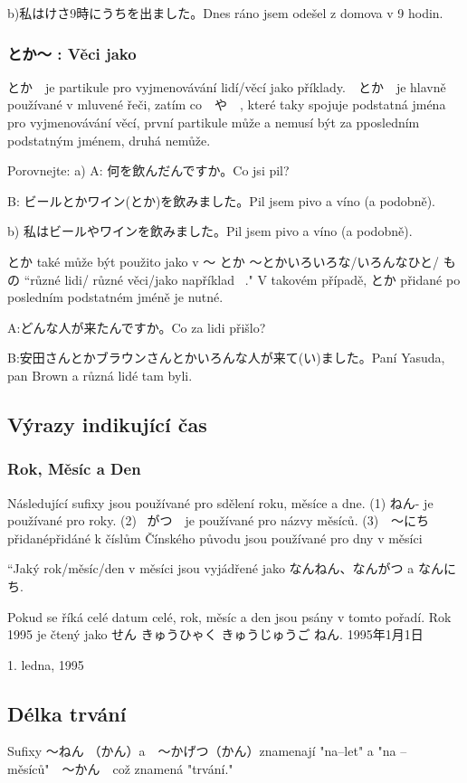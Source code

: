 b)私はけさ9時にうちを出ました。Dnes ráno jsem odešel z domova v 9 hodin.


\subsubsection{ とか〜 : Věci jako}
とか　je partikule pro vyjmenovávání lidí/věcí jako příklady.　とか　je hlavně používané v mluvené řeči, zatím co　や　, které taky spojuje podstatná jména pro vyjmenovávání věcí, první partikule může a nemusí být za pposledním podstatným jménem, druhá nemůže.

Porovnejte:
a)
 A: 何を飲んだんですか。Co jsi pil?
 
B: ビールとかワイン(とか)を飲みました。Pil jsem pivo a víno (a podobně).

b) 私はビールやワインを飲みました。Pil jsem pivo a víno (a podobně).


とか také může být použito jako v 〜 とか 〜とかいろいろな/いろんなひと/ もの “různé lidi/ různé věci/jako například ~." V takovém případě, とか přidané po posledním podstatném jméně je nutné.

A:どんな人が来たんですか。Co za lidi přišlo?

B:安田さんとかブラウンさんとかいろんな人が来て(い)ました。Paní Yasuda, pan Brown a různá lidé tam byli.

\subsection{Výrazy indikující čas}
\subsubsection{ Rok, Měsíc a Den}

Následující sufixy jsou používané pro sdělení roku, měsíce a dne.
(1) ねん- je používané pro roky.
(2) ~がつ　je používané pro názvy měsíců.
(3)　〜にち přidanépřidáné k číslům Čínského původu jsou používané pro dny v měsíci

“Jaký rok/měsíc/den v měsíci jsou vyjádřené jako  なんねん、なんがつ a なんにち. 

Pokud se říká celé datum celé, rok, měsíc a den jsou psány v tomto pořadí. Rok 1995 je čtený jako せん きゅうひゃく きゅうじゅうご ねん.
1995年1月1日

1. ledna, 1995

\subsection{Délka trvání}
Sufixy 〜ねん （かん）a　〜かげつ（かん）znamenají  "na--let" a "na --měsíců"　〜かん　což znamená "trvání."


